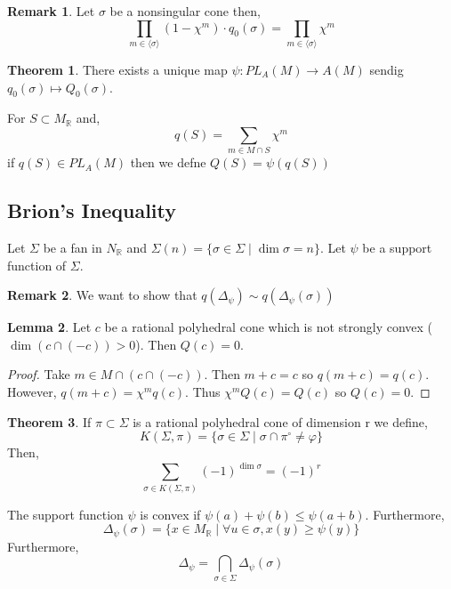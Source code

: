 \documentclass[12pt]{extarticle}
\newcommand{\R}{\mathbb{R}}
\theoremstyle{definition}
\newtheorem{theorem}{Theorem}[section]
\newtheorem{lemma}[theorem]{Lemma}
\newtheorem{remark}{Remark}
\newenvironment{definition}[1][Definition:]{\begin{trivlist}
\item[\hskip \labelsep {\bfseries #1}]}{\end{trivlist}}
\newcommand{\gen}[1]{\langle #1 \rangle}
\begin{document}
\begin{remark}
Let $\sigma$ be a nonsingular cone then,
\[ \prod_{m \in \gen{\sigma}} (1 - \chi^m) \cdot q_0(\sigma) = \prod_{m \in \gen{\sigma}} \chi^m \]
\end{remark}

\begin{theorem}
There exists a unique map $\psi : PL_A(M) \to A(M)$ sendig $q_0(\sigma) \mapsto Q_0(\sigma)$.
\end{theorem}

\begin{definition}
For $S \subset M_\R$ and,
\[ q(S) = \sum_{m \in M \cap S} \chi^m \]
if $q(S) \in PL_A(M)$ then we defne $Q(S) = \psi(q(S))$
\end{definition}

\subsection{Brion's Inequality}

Let $\Sigma$ be a fan in $N_\R$ and $\Sigma(n) =\{ \sigma \in \Sigma \mid \dim{\sigma} = n \}$. Let $\psi$ be a support function of $\Sigma$. 

\begin{remark}
We want to show that $q(\Delta_{\psi}) \sim q(\Delta_\psi(\sigma))$
\end{remark}

\begin{lemma}
Let $c$ be a rational polyhedral cone which is not strongly convex ($\dim{(c \cap (-c))} > 0$). Then $Q(c) =0$.
\end{lemma}

\begin{proof}
Take $m \in M \cap (c \cap (-c))$. Then $m + c = c$ so $q(m + c) = q(c)$. However, $q(m + c) = \chi^m q(c)$. Thus $\chi^m Q(c) = Q(c)$ so $Q(c) = 0$. 
\end{proof}

\begin{theorem}
If $\pi \subset \Sigma$ is a rational polyhedral cone of dimension r we define,
\[ K(\Sigma, \pi) = \{ \sigma \in \Sigma \mid \sigma \cap \pi^\circ \neq \varphi \} \]
Then,
\[ \sum_{\sigma \in K(\Sigma, \pi)} (-1)^{\dim{\sigma}} = (-1)^r \]
\end{theorem}

\begin{definition}
The support function $\psi$ is convex if $\psi(a) + \psi(b) \le \psi(a + b)$. Furthermore,
\[ \Delta_\psi(\sigma) = \{ x \in M_\R \mid \forall u \in \sigma, x(y) \ge \psi(y) \} \]
Furthermore,
\[ \Delta_\psi = \bigcap_{\sigma \in \Sigma} \Delta_\psi(\sigma) \]
\end{definition}
\end{document}
